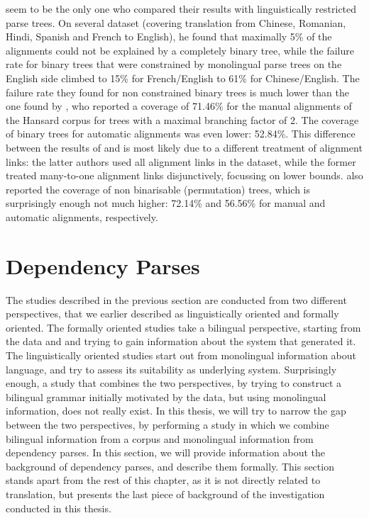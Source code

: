 \cite{wellington2006empirical} seem to be the only one who compared their results with linguistically restricted parse trees. On several dataset (covering translation from Chinese, Romanian, Hindi, Spanish and French to English), he found that maximally 5\% of the alignments could not be explained by a completely binary tree, while the failure rate for binary trees that were constrained by monolingual parse trees on the English side climbed to 15\% for French/English to 61\% for Chinese/English. The failure rate they found for non constrained binary trees is much lower than the one found by \cite{simaan2013hats}, who reported a coverage of 71.46\% for the manual alignments of the Hansard corpus for trees with a maximal branching factor of 2. The coverage of binary trees for automatic alignments was even lower: 52.84\%. This difference between the results of \cite{wellington2006empirical} and \cite{simaan2013hats} is most likely due to a different treatment of alignment links: the latter authors used all alignment links in the dataset, while the former treated many-to-one alignment links disjunctively, focussing on lower bounds. \cite{simaan2013hats} also reported the coverage of non binarisable (permutation) trees, which is surprisingly enough not much higher: 72.14\% and 56.56\% for manual and automatic alignments, respectively.


\section{Dependency Parses}
\label{sec:dep_parses}

The studies described in the previous section are conducted from two different perspectives, that we earlier described as linguistically oriented and formally oriented. The formally oriented studies take a bilingual perspective, starting from the data and and trying to gain information about the system that generated it. The linguistically oriented studies start out from monolingual information about language, and try to assess its suitability as underlying system. Surprisingly enough, a study that combines the two perspectives, by trying to construct a bilingual grammar initially motivated by the data, but using monolingual information, does not really exist. In this thesis, we will try to narrow the gap between the two perspectives, by performing a study in which we combine bilingual information from a corpus and monolingual information from dependency parses. In this section, we will provide information about the background of dependency parses, and describe them formally. This section stands apart from the rest of this chapter, as it is not directly related to translation, but presents the last piece of background of the investigation conducted in this thesis.

